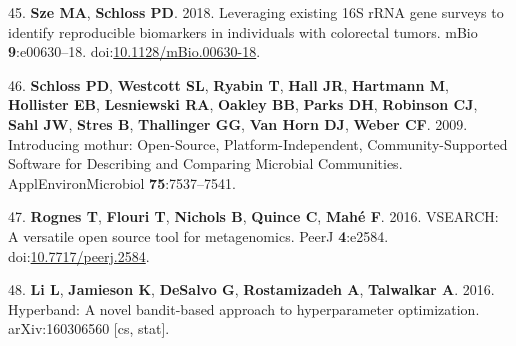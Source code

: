\documentclass[
  11pt,
]{article}
\begin{document}
\leavevmode\hypertarget{ref-sze_leveraging_2018}{}%
45. \textbf{Sze MA}, \textbf{Schloss PD}. 2018. Leveraging existing 16S
rRNA gene surveys to identify reproducible biomarkers in individuals
with colorectal tumors. mBio \textbf{9}:e00630--18.
doi:\href{https://doi.org/10.1128/mBio.00630-18}{10.1128/mBio.00630-18}.

\leavevmode\hypertarget{ref-schloss_introducing_2009}{}%
46. \textbf{Schloss PD}, \textbf{Westcott SL}, \textbf{Ryabin T},
\textbf{Hall JR}, \textbf{Hartmann M}, \textbf{Hollister EB},
\textbf{Lesniewski RA}, \textbf{Oakley BB}, \textbf{Parks DH},
\textbf{Robinson CJ}, \textbf{Sahl JW}, \textbf{Stres B},
\textbf{Thallinger GG}, \textbf{Van Horn DJ}, \textbf{Weber CF}. 2009.
Introducing mothur: Open-Source, Platform-Independent,
Community-Supported Software for Describing and Comparing Microbial
Communities. ApplEnvironMicrobiol \textbf{75}:7537--7541.

\leavevmode\hypertarget{ref-rognes_vsearch_2016}{}%
47. \textbf{Rognes T}, \textbf{Flouri T}, \textbf{Nichols B},
\textbf{Quince C}, \textbf{Mahé F}. 2016. VSEARCH: A versatile open
source tool for metagenomics. PeerJ \textbf{4}:e2584.
doi:\href{https://doi.org/10.7717/peerj.2584}{10.7717/peerj.2584}.

\leavevmode\hypertarget{ref-li_hyperband:_2016}{}%
48. \textbf{Li L}, \textbf{Jamieson K}, \textbf{DeSalvo G},
\textbf{Rostamizadeh A}, \textbf{Talwalkar A}. 2016. Hyperband: A novel
bandit-based approach to hyperparameter optimization. arXiv:160306560
{[}cs, stat{]}.

\newpage
\end{document}
